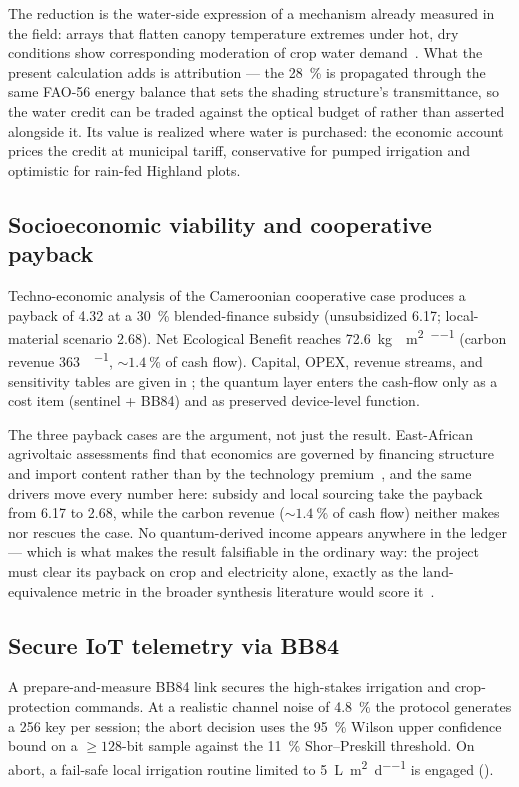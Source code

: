 \documentclass[preprint,12pt]{elsarticle}
\begin{document}
The reduction is the water-side expression of a mechanism already measured in the field: arrays that flatten canopy temperature extremes under hot, dry conditions show corresponding moderation of crop water demand~\cite{Vernier2026}. What the present calculation adds is attribution --- the \qty{28}{\percent} is propagated through the same FAO-56 energy balance that sets the shading structure's transmittance, so the water credit can be traded against the optical budget of  rather than asserted alongside it. Its value is realized where water is purchased: the economic account prices the credit at municipal tariff, conservative for pumped irrigation and optimistic for rain-fed Highland plots.

\subsection{Socioeconomic viability and cooperative payback}
Techno-economic analysis of the Cameroonian cooperative case produces a payback of \qty{4.32}{\yr} at a \qty{30}{\percent} blended-finance subsidy (unsubsidized \qty{6.17}{\yr}; local-material scenario \qty{2.68}{\yr}). Net Ecological Benefit reaches \qty{72.6}{\kg{}\per\m\squared\per\yr} (carbon revenue \qty{363}{\USD\per\yr}, $\sim\qty{1.4}{\percent}$ of cash flow). Capital, OPEX, revenue streams, and sensitivity tables are given in ; the quantum layer enters the cash-flow only as a cost item (sentinel + BB84) and as preserved device-level function.

The three payback cases are the argument, not just the result. East-African agrivoltaic assessments find that economics are governed by financing structure and import content rather than by the technology premium~\cite{RandleBoggis2026}, and the same drivers move every number here: subsidy and local sourcing take the payback from \qty{6.17}{\yr} to \qty{2.68}{\yr}, while the carbon revenue ($\sim\qty{1.4}{\percent}$ of cash flow) neither makes nor rescues the case. No quantum-derived income appears anywhere in the ledger --- which is what makes the result falsifiable in the ordinary way: the project must clear its payback on crop and electricity alone, exactly as the land-equivalence metric in the broader synthesis literature would score it~\cite{Mahim2025}.

\subsection{Secure IoT telemetry via BB84}
A prepare-and-measure BB84 link secures the high-stakes irrigation and crop-protection commands. At a realistic channel noise of \qty{4.8}{\percent} the protocol generates a \qty{256}{\bit} key per session; the abort decision uses the \qty{95}{\percent} Wilson upper confidence bound on a $\geq 128$-bit sample against the \qty{11}{\percent} Shor--Preskill threshold. On abort, a fail-safe local irrigation routine limited to \qty{5}{\L\per\m\squared\per\day} is engaged ().
\end{document}
